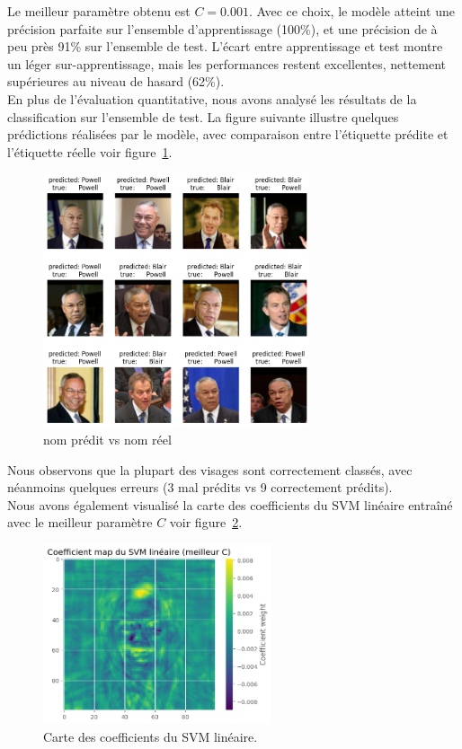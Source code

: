 \documentclass[12pt]{article}
\begin{document}
Le meilleur paramètre obtenu est $C=0.001$. Avec ce choix, le modèle atteint 
une précision parfaite sur l’ensemble d’apprentissage (100\%), et une précision de à peu près 91\% sur l’ensemble de test. L’écart entre apprentissage et test montre un léger sur-apprentissage, mais les performances restent excellentes, nettement supérieures au niveau de hasard (62\%). \\




En plus de l’évaluation quantitative, nous avons analysé les résultats de la 
classification sur l’ensemble de test. La figure suivante illustre quelques prédictions réalisées par le modèle, avec comparaison entre l’étiquette prédite et l’étiquette réelle voir figure~\ref{fig:figure8}.\\

\begin{figure}[h!]
  \centering
  \includegraphics[width=0.7\textwidth]{images/prediction.png}
  \caption{nom prédit vs nom réel}
  \label{fig:figure8}
\end{figure}

Nous observons que la plupart des visages sont correctement classés, avec néanmoins quelques erreurs (3 mal prédits vs 9 correctement prédits).\\

Nous avons également visualisé la carte des coefficients du SVM linéaire entraîné avec le meilleur paramètre $C$ voir figure~\ref{fig:figure9}.

\begin{figure}[h!]
  \centering
  \includegraphics[width=0.6\textwidth]{images/C.png}
  \caption{Carte des coefficients du SVM linéaire.}
  \label{fig:figure9}
\end{figure}
\end{document}
